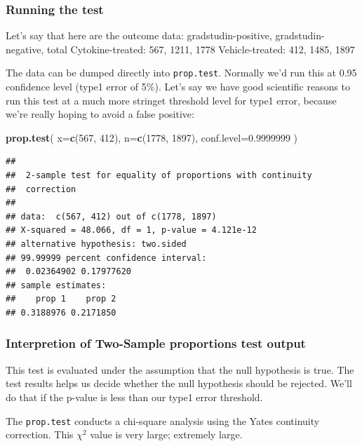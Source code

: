 \documentclass[]{book}
\newenvironment{Shaded}{\begin{snugshade}}{\end{snugshade}}
\newcommand{\DataTypeTok}[1]{\textcolor[rgb]{0.13,0.29,0.53}{#1}}
\newcommand{\DecValTok}[1]{\textcolor[rgb]{0.00,0.00,0.81}{#1}}
\newcommand{\FloatTok}[1]{\textcolor[rgb]{0.00,0.00,0.81}{#1}}
\newcommand{\KeywordTok}[1]{\textcolor[rgb]{0.13,0.29,0.53}{\textbf{#1}}}
\newcommand{\NormalTok}[1]{#1}
\begin{document}
\hypertarget{running-the-test}{%
\subsubsection{Running the test}\label{running-the-test}}

Let's say that here are the outcome data:
gradstudin-positive, gradstudin-negative, total
Cytokine-treated: 567, 1211, 1778
Vehicle-treated: 412, 1485, 1897

The data can be dumped directly into \texttt{prop.test}. Normally we'd run this at 0.95 confidence level (type1 error of 5\%). Let's say we have good scientific reasons to run this test at a much more stringet threshold level for type1 error, because we're really hoping to avoid a false positive:

\begin{Shaded}
\begin{Highlighting}[]
\KeywordTok{prop.test}\NormalTok{(}
  \DataTypeTok{x=}\KeywordTok{c}\NormalTok{(}\DecValTok{567}\NormalTok{, }\DecValTok{412}\NormalTok{),}
  \DataTypeTok{n=}\KeywordTok{c}\NormalTok{(}\DecValTok{1778}\NormalTok{, }\DecValTok{1897}\NormalTok{),}
  \DataTypeTok{conf.level=}\FloatTok{0.9999999}
\NormalTok{  )}
\end{Highlighting}
\end{Shaded}

\begin{verbatim}
## 
##  2-sample test for equality of proportions with continuity
##  correction
## 
## data:  c(567, 412) out of c(1778, 1897)
## X-squared = 48.066, df = 1, p-value = 4.121e-12
## alternative hypothesis: two.sided
## 99.99999 percent confidence interval:
##  0.02364902 0.17977620
## sample estimates:
##    prop 1    prop 2 
## 0.3188976 0.2171850
\end{verbatim}

\hypertarget{interpretion-of-two-sample-proportions-test-output}{%
\subsubsection{Interpretion of Two-Sample proportions test output}\label{interpretion-of-two-sample-proportions-test-output}}

This test is evaluated under the assumption that the null hypothesis is true. The test results helps us decide whether the null hypothesis should be rejected. We'll do that if the p-value is less than our type1 error threshold.

The \texttt{prop.test} conducts a chi-square analysis using the Yates continuity correction. This \(\chi^2\) value is very large; extremely large.
\end{document}
